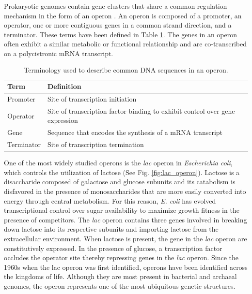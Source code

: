 \documentclass{article}
\begin{document}
Prokaryotic genomes contain gene clusters that share a common regulation mechanism in the form of an operon \cite{jacob_genetic_1961}. An operon is composed of a promoter, an operator, one or more contiguous genes in a common strand direction, and a terminator. These terms have been defined in Table \ref{table:definitions}. The genes in an operon often exhibit a similar metabolic or functional relationship and are co-transcribed on a polycistronic mRNA transcript. 
\begin{table}
\caption{Terminology used to describe common DNA sequences in an operon.}
    \label{table:definitions}
     \centering
    \begin{tabular}{lll}
            \toprule
            Term       & Definition                                                                   &  \\
            \midrule
            Promoter   & Site of transcription initiation                                             &  \\
            Operator   & Site of transcription factor binding to exhibit control over gene expression &  \\
            Gene      & Sequence that encodes the synthesis of a mRNA transcript                    &  \\
            Terminator & Site of transcription termination                                            & 
        \end{tabular}
    \bottomrule
\end{table}

One of the most widely studied operons is the \textit{lac} operon in \textit{Escherichia coli}, which controls the utilization of lactose (See Fig. \ref{fig:lac_operon}). Lactose is a disaccharide composed of galactose and glucose subunits and its catabolism is disfavored in the presence of monosaccharides that are more easily converted into energy through central metabolism. For this reason, \textit{E. coli} has evolved transcriptional control over sugar availability to maximize growth fitness in the presence of competitors. The \textit{lac} operon contains three genes involved in breaking down lactose into its respective subunits and importing lactose from the extracellular environment. When lactose is present, the gene in the \textit{lac} operon are constitutively expressed. In the presence of glucose, a transcription factor occludes the operator site thereby repressing genes in the \textit{lac} operon. Since the 1960s when the lac operon was first identified, operons have been identified across the kingdoms of life. Although they are most present in bacterial and archaeal genomes, the operon represents one of the most ubiquitous genetic structures.
\end{document}
